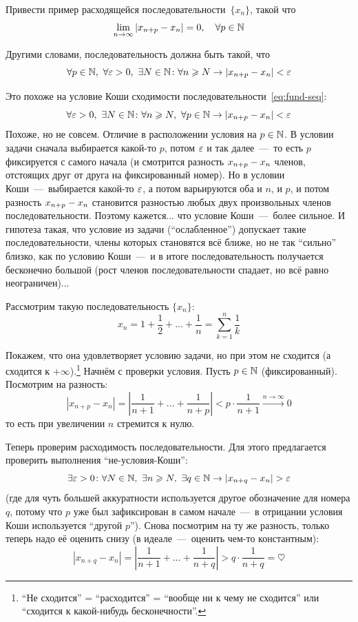 \documentclass[a4paper,12pt]{article}
\begin{document}
  Привести пример расходящейся последовательности~$\{x_n\}$, такой что
  \[
    \lim_{n \to \infty} |x_{n + p} - x_{n}| = 0,\quad \forall p \in \mathbb N
  \]
  \begin{solution}
    Другими словами, последовательность должна быть такой, что
    \[
      \forall p \in \mathbb N,\ \forall \varepsilon > 0,\ \exists N \in \mathbb N\colon \forall n \geqslant N \to |x_{n + p} - x_n| < \varepsilon
    \]
    
    Это похоже на условие Коши сходимости последовательности~\eqref{eq:fund-seq}:
    \[
      \forall \varepsilon > 0,\ \exists N \in \mathbb N\colon \forall n \geqslant N,\ \forall p \in \mathbb N \to |x_{n + p} - x_n| < \varepsilon
    \]
    Похоже, но не совсем.
    Отличие в расположении условия на $p \hm\in \NN$.
    В условии задачи сначала выбирается какой-то $p$, потом $\varepsilon$ и так далее~---~то есть $p$ фиксируется с самого начала (и смотрится разность $x_{n + p} \hm- x_n$ членов, отстоящих друг от друга на фиксированный номер).
    Но в условии Коши~---~выбирается какой-то $\varepsilon$, а потом варьируются оба и $n$, и $p$, и потом разность $x_{n + p} \hm- x_n$ становится разностью любых двух произвольных членов последовательности.
    Поэтому кажется... что условие Коши~---~более сильное.
    И гипотеза такая, что условие из задачи (``ослабленное'') допускает такие последовательности, члены которых становятся всё ближе, но не так ``сильно'' близко, как по условию Коши~---~и в итоге последовательность получается бесконечно большой (рост членов последовательности спадает, но всё равно неограничен)...  %
    
    Рассмотрим такую последовательность $\{x_n\}$:
    \[
      x_n = 1 + \frac{1}{2} + \ldots + \frac{1}{n} = \sum_{k = 1}^n \frac{1}{k}
    \]
    
    Покажем, что она удовлетворяет условию задачи, но при этом не сходится (а сходится к $+\infty$).\footnote{
      ``Не сходится'' = ``расходится'' = ``вообще ни к чему не сходится'' или ``сходится к какой-нибудь бесконечности''.
    }
    Начнём с проверки условия.
    Пусть $p \hm\in \NN$ (фиксированный).
    Посмотрим на разность:
    \[
      |x_{n + p} - x_n|
        = \left|\frac{1}{n + 1} + \ldots + \frac{1}{n + p}\right|
        < p \cdot \frac{1}{n + 1} \xrightarrow{n \to \infty} 0
    \]
    то есть при увеличении $n$ стремится к нулю.
    
    Теперь проверим расходимость последовательности.
    Для этого предлагается проверить выполнения ``не-условия-Коши'':
    \[
      \exists \eps > 0\colon \forall N \in \NN,\ \exists n \geq N,\ \exists q \in \NN \to |x_{n + q} - x_n| > \eps
    \]
    (где для чуть большей аккуратности используется другое обозначение для номера $q$, потому что $p$ уже был зафиксирован в самом начале~---~в отрицании условия Коши используется ``другой $p$'').
    Снова посмотрим на ту же разность, только теперь надо её оценить снизу (в идеале~---~оценить чем-то константным):
    \[
      |x_{n + q} - x_n|
        = \left|\frac{1}{n + 1} + \ldots + \frac{1}{n + q}\right|
        > q \cdot \frac{1}{n + q} = \heartsuit
    \]
    

\end{solution}
\end{document}
